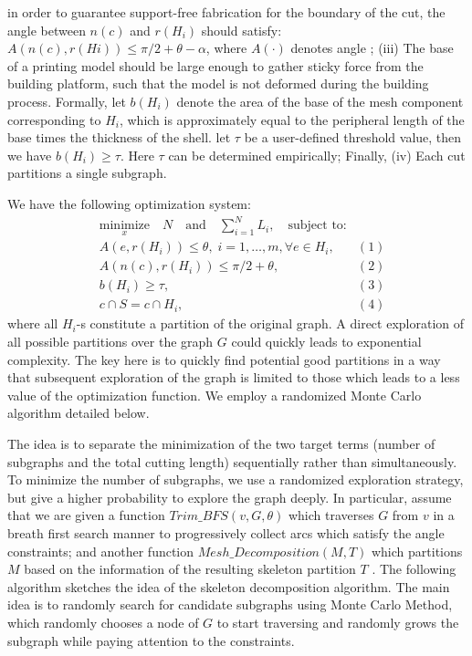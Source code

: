 in order to guarantee support-free fabrication for the boundary of the cut, the angle between $n(c)$ and $r(H_i)$ should satisfy: $A(n(c), r(Hi)) \leq \pi/2 + \theta -\alpha $, where $A(\cdot)$ denotes angle ;
(iii) The base of a printing model should be large enough to gather sticky force from the building platform, such that the model is not deformed during the building process. Formally, let $b(H_i)$ denote the area of the base of the mesh component corresponding to $H_i$, which is approximately equal to the peripheral length of the base times the thickness of the shell. let $\tau$ be a user-defined threshold value, then we have $b(H_i) \geq \tau$. Here $\tau$ can be determined empirically; Finally,
(iv) Each cut partitions a single subgraph.

We have the following optimization system:
\begin{equation*}
\begin{aligned}
& \underset{x}{\text{minimize}} \quad N \quad \text{and} \quad \sum_{i=1}^N{L_i},
\quad \text{subject to:} \\
& A(e, r(H_i)) \leq \theta, \; i = 1, \ldots, m, \forall e \in H_i, & (1)\\
& A(n(c), r(H_i)) \leq \pi/2+ \theta, & (2)\\
& b(H_i) \geq \tau, & (3)\\
& c \cap S = c \cap H_i, & (4)
\end{aligned}
\end{equation*}
where all $H_i$-s constitute a partition of the original graph. A direct exploration of all possible partitions over the graph $G$ could quickly leads to exponential complexity. The key here is to quickly find potential good partitions in a way that subsequent exploration of the graph is limited to those which leads to a less value of the optimization function. We employ a randomized Monte Carlo algorithm detailed below.

The idea is to separate the minimization of the two target terms (number of subgraphs and the total cutting length) sequentially rather than simultaneously. To minimize the number of subgraphs, we use a randomized exploration strategy, but give a higher probability to explore the graph deeply. In particular, assume that we are given a function $Trim\_BFS(v, G, \theta)$ which traverses $G$ from $v$ in a breath first search manner to progressively collect arcs which satisfy the angle constraints; and another function $Mesh\_Decomposition(M, T)$ which partitions $M$ based on the information of the resulting skeleton partition $T$ . The following algorithm sketches the idea of the skeleton decomposition algorithm. The main idea is to randomly search for candidate subgraphs using Monte Carlo Method, which randomly chooses a node of $G$ to start traversing and randomly grows the subgraph while paying attention to the constraints.

